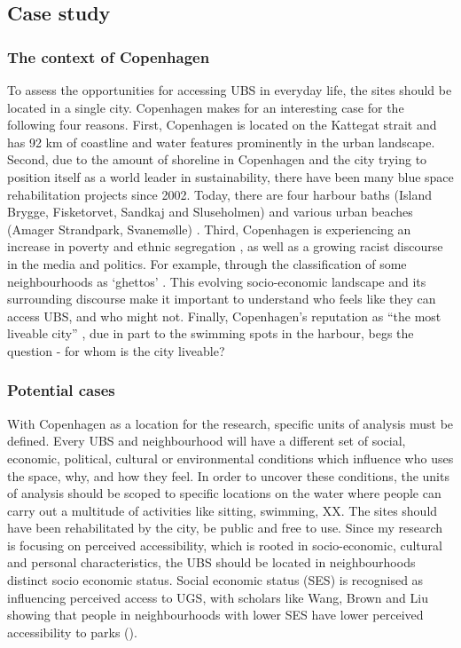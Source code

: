 \documentclass{article}
\begin{document}
\subsection{Case study}

\subsubsection{The context of Copenhagen}

To assess the opportunities for accessing UBS in everyday life, the sites should be located in a single city. Copenhagen makes for an interesting case for the following four reasons. First, Copenhagen is located on the Kattegat strait and has 92 km of coastline \parencite{Comertler2017} and water features prominently in the urban landscape. Second, due to the amount of shoreline in Copenhagen and the city trying to position itself as a world leader in sustainability, there have been many blue space rehabilitation projects since 2002. Today, there are four harbour baths (Island Brygge, Fisketorvet, Sandkaj and Sluseholmen) and various urban beaches (Amager Strandpark, Svanemølle) \parencite{visitcopenhagen_baths}. Third, Copenhagen is experiencing an increase in poverty and ethnic segregation \parencite{moller2015socioeconomic}, as well as a growing racist discourse in the media and politics. For example, through the classification of some neighbourhoods as ‘ghettos’ \parencite{simonsen2008practice}. This evolving socio-economic landscape and its surrounding discourse make it important to understand who feels like they can access UBS, and who might not. Finally, Copenhagen’s reputation as “the most liveable city” \parencite{visitdenmark_2021}, due in part to the swimming spots in the harbour, begs the question - for whom is the city liveable?

\subsubsection{Potential cases}

With Copenhagen as a location for the research, specific units of analysis must be defined. Every UBS and neighbourhood will have a different set of social, economic, political, cultural or environmental conditions which influence who uses the space, why, and how they feel. In order to uncover these conditions, the units of analysis should be scoped to specific locations on the water where people can carry out a multitude of activities like sitting, swimming, XX. The sites should have been rehabilitated by the city, be public and free to use. 
Since my research is focusing on perceived accessibility, which is rooted in socio-economic, cultural and personal characteristics, the UBS should be located in neighbourhoods distinct socio economic status. Social economic status (SES) is recognised as influencing perceived access to UGS, with scholars like Wang, Brown and Liu showing that people in neighbourhoods with lower SES have lower perceived accessibility to parks (\citeyear{wang2015physical}).
\end{document}
